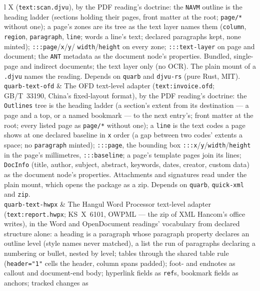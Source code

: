 \documentclass{report}
\begin{document}
\begin{xltabular}{\textwidth}{l X}
  (\texttt{text:scan.djvu}), by the PDF reading's doctrine: the
  \texttt{NAVM} outline is the heading ladder (sections holding
  their pages, front matter at the root; \texttt{page/*} without
  one); a page's zones are its tree as the text layer names them
  (\texttt{column}, \texttt{region}, \texttt{paragraph},
  \texttt{line}; words a line's text; declared paragraphs kept,
  none minted); \texttt{:::page}/\texttt{x}/\texttt{y}/
  \texttt{width}/\texttt{height} on every zone; \texttt{:::text-layer}
  on page and document; the \texttt{ANT} metadata as the document
  node's properties. Bundled, single-page and indirect documents;
  the text layer only (no OCR). The plain mount of a \texttt{.djvu}
  names the reading. Depends on \texttt{quarb} and
  \texttt{djvu-rs} (pure Rust, MIT). \\
\texttt{quarb-text-ofd} & The OFD text-level adapter
  (\texttt{text:invoice.ofd}; GB/T~33190, China's fixed-layout
  format), by the PDF reading's doctrine: the \texttt{Outlines}
  tree is the heading ladder (a section's extent from its
  destination --- a page and a top, or a named bookmark --- to the
  next entry's; front matter at the root; every listed page as
  \texttt{page/*} without one); a \texttt{line} is the text codes
  a page shows at one declared baseline in \texttt{x} order (a gap
  between two codes' extents a space; no \texttt{paragraph}
  minted); \texttt{:::page}, the bounding box
  \texttt{:::x}/\texttt{y}/\texttt{width}/\texttt{height} in
  the page's millimetres, \texttt{:::baseline}; a page's template
  pages join its lines; \texttt{DocInfo} (title, author, subject,
  abstract, keywords, dates, creator, custom data) as the document
  node's properties. Attachments and signatures read under the
  plain mount, which opens the package as a zip. Depends on
  \texttt{quarb}, \texttt{quick-xml} and \texttt{zip}. \\
\texttt{quarb-text-hwpx} & The Hangul Word Processor text-level
  adapter (\texttt{text:report.hwpx}; KS~X~6101, OWPML — the zip of
  XML Hancom's office writes), in the Word and OpenDocument readings'
  vocabulary from declared structure alone: a heading is a paragraph
  whose paragraph property declares an outline level (style names
  never matched), a list the run of paragraphs declaring a numbering
  or bullet, nested by level; tables through the shared table rule
  (\texttt{header="1"} cells the header, column spans padded); foot-
  and endnotes as callout and document-end body; hyperlink fields
  as \texttt{ref}s, bookmark fields as anchors; tracked changes as

\end{xltabular}
\end{document}
